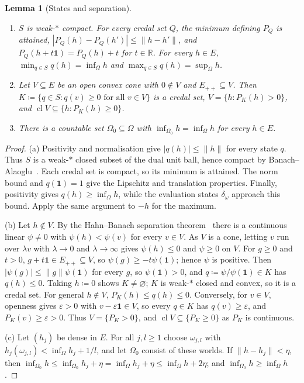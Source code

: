 \documentclass[11pt]{article}
\newtheorem{lemma}[theorem]{Lemma}
\theoremstyle{definition}
\newcommand{\R}{\mathbb R}
\newcommand{\one}{\mathbf 1}
\newcommand{\Epp}{E_{++}}
\DeclareMathOperator{\cl}{cl}
\begin{document}
\begin{lemma}[States and separation]\label{lem:states}
\begin{enumerate}[label=(\alph*)]
\item $S$ is weak-$\ast$ compact. For every credal set $Q$, the minimum defining $P_Q$ is attained, $|P_Q(h)-P_Q(h')|\le\|h-h'\|$, and $P_Q(h+t\one)=P_Q(h)+t$ for $t\in\R$. For every $h\in E$, $\min_{q\in S}q(h)=\inf_\Omega h$ and $\max_{q\in S}q(h)=\sup_\Omega h$.
\item Let $V\subseteq E$ be an open convex cone with $0\notin V$ and $\Epp\subseteq V$. Then $K\coloneqq\{q\in S:q(v)\ge0\text{ for all }v\in V\}$ is a credal set, $V=\{h:P_K(h)>0\}$, and $\cl V\subseteq\{h:P_K(h)\ge0\}$.
\item There is a countable set $\Omega_0\subseteq\Omega$ with $\inf_{\Omega_0}h=\inf_\Omega h$ for every $h\in E$.
\end{enumerate}
\end{lemma}
\begin{proof}
(a) Positivity and normalisation give $|q(h)|\le\|h\|$ for every state $q$.
Thus $S$ is a weak-$\ast$ closed subset of the dual unit ball, hence compact by
Banach--Alaoglu~\cite{Rudin}. Each credal set is compact, so its minimum is attained.
The norm bound and $q(\one)=1$ give the Lipschitz and translation properties.
Finally, positivity gives $q(h)\ge\inf_\Omega h$, while the evaluation states
$\delta_\omega$ approach this bound. Apply the same argument to $-h$ for the maximum.


(b) Let $h\notin V$. By the Hahn--Banach separation theorem~\cite{Rudin} there is a continuous linear $\psi\ne0$ with $\psi(h)<\psi(v)$ for every $v\in V$. As $V$ is a cone, letting $v$ run over $\lambda v$ with $\lambda\to0$ and $\lambda\to\infty$ gives $\psi(h)\le0$ and $\psi\ge0$ on $V$. For $g\ge0$ and $t>0$, $g+t\one\in\Epp\subseteq V$, so $\psi(g)\ge-t\psi(\one)$; hence $\psi$ is positive. Then $|\psi(g)|\le\|g\|\psi(\one)$ for every $g$, so $\psi(\one)>0$, and $q\coloneqq\psi/\psi(\one)\in K$ has $q(h)\le0$. Taking $h\coloneqq0$ shows $K\ne\varnothing$; $K$ is weak-$\ast$ closed and convex, so it is a credal set. For general $h\notin V$, $P_K(h)\le q(h)\le0$. Conversely, for $v\in V$, openness gives $\varepsilon>0$ with $v-\varepsilon\one\in V$, so every $q\in K$ has $q(v)\ge\varepsilon$, and $P_K(v)\ge\varepsilon>0$. Thus $V=\{P_K>0\}$, and $\cl V\subseteq\{P_K\ge0\}$ as $P_K$ is continuous.

(c) Let $(h_j)$ be dense in $E$. For all $j,l\ge1$ choose $\omega_{j,l}$ with $h_j(\omega_{j,l})<\inf_\Omega h_j+1/l$, and let $\Omega_0$ consist of these worlds. If $\|h-h_j\|<\eta$, then $\inf_{\Omega_0}h\le\inf_{\Omega_0}h_j+\eta=\inf_\Omega h_j+\eta\le\inf_\Omega h+2\eta$; and $\inf_{\Omega_0}h\ge\inf_\Omega h$.
\end{proof}
\end{document}
